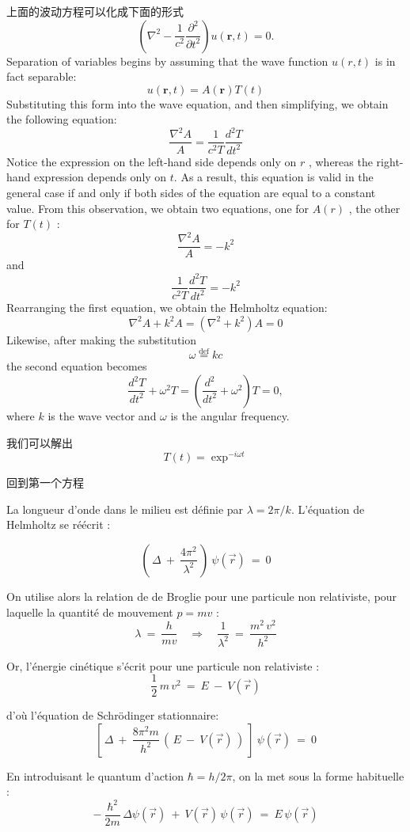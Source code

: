 上面的波动方程可以化成下面的形式
$$
\left(\nabla^2-\frac{1}{c^2}\frac{\partial^2}{\partial{t}^2}\right)u(\mathbf{r},t)=0.
$$
Separation of variables begins by assuming that the wave function $u(r, t)$ is in fact separable:
$$u(\mathbf{r},t)=A (\mathbf{r}) T(t)$$
Substituting this form into the wave equation, and then simplifying, we obtain the following equation:
$$\dfrac{\nabla^2 A}{A} = \dfrac{1}{c^2 T } \dfrac{d^2 T}{d t^2}$$
Notice the expression on the left-hand side depends only on $r$ , whereas the right-hand expression depends only on $t$.
As a result, this equation is valid in the general case if and only if both sides of the equation are equal to a constant value.
From this observation, we obtain two equations, one for $A(r)$ , the other for $T(t)$ :
$$\dfrac{\nabla^2 A}{A} = -k^2$$
and
$$\dfrac{1}{c^2 T } \dfrac{d^2 T}{d t^2} = -k^2$$
Rearranging the first equation, we obtain the Helmholtz equation:
$$\nabla^2 A + k^2 A  =  ( \nabla^2 + k^2)  A  =  0$$
Likewise, after making the substitution
$$ \omega  \stackrel{\mathrm{def}}{=}  kc $$
the second equation becomes
$$\frac{d^2{T}}{d{t}^2} + \omega^2T  =  \left( \dfrac{d^2 }{dt^2 } + \omega^2 \right) T  =  0,$$
where $k$ is the wave vector and $\omega$ is the angular frequency.\par
我们可以解出
$$
T(t) = \exp^{-i \omega t}
$$

回到第一个方程\par
La longueur d'onde dans le milieu est d\'efinie par $\lambda = 2 \pi/k$. L'\'equation de Helmholtz se r\'e\'ecrit :

$$
\left( \, \Delta \ + \ \frac{4\pi^2}{\lambda^2} \, \right) \ \psi(\vec{r}) \ = \ 0
$$

On utilise alors la relation de de Broglie pour une particule non relativiste, pour laquelle la quantit\'e de mouvement $p = m v$  :
$$
\lambda \ = \ \frac{h}{mv} \quad \Longrightarrow \quad \frac{1}{\lambda^2} \ = \ \frac{m^2 \, v^2}{h^2}
$$

Or, l'\'energie cin\'etique s'\'ecrit pour une particule non relativiste :
$$
\frac{1}{2} \, m \, v^2 \ = \ E \ - \ V(\vec{r})
$$

d'o\`u l'\'equation de Schr\"odinger stationnaire:
$$
\left[ \, \Delta \ + \ \frac{8\pi^2m}{h^2} \, \left( \, E \ - \ V(\vec{r}) \, \right) \ \right] \ \psi(\vec{r}) \ = \ 0
$$

En introduisant le quantum d'action $\hbar = h/2\pi$, on la met sous la forme habituelle :
$$
- \ \frac{\hbar^2}{2m} \, \Delta \psi(\vec{r}) \ + \ V(\vec{r}) \, \psi(\vec{r}) \ = \ E \, \psi(\vec{r})
$$

